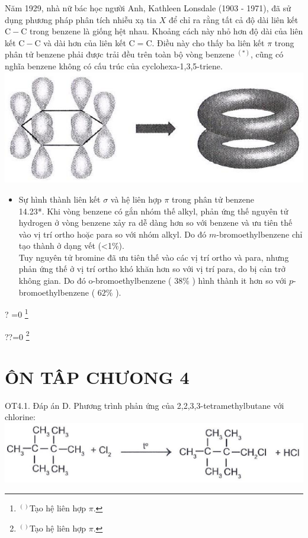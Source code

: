 \documentclass[10pt]{article}
\let\svthefootnote\thefootnote
\newcommand\blfootnotetext[1]{%
  \let\thefootnote\relax\footnote{#1}%
  \addtocounter{footnote}{-1}%
  \let\thefootnote\svthefootnote%
}
\let\svfootnotetext\footnotetext
\renewcommand\footnotetext[2][?]{%
  \if\relax#1\relax%
    \ifnum\value{footnote}=0\blfootnotetext{#2}\else\svfootnotetext{#2}\fi%
  \else%
    \if?#1\ifnum\value{footnote}=0\blfootnotetext{#2}\else\svfootnotetext{#2}\fi%
    \else\svfootnotetext[#1]{#2}\fi%
  \fi
}
\begin{document}
Năm 1929, nhà nữ bác học người Anh, Kathleen Lonsdale (1903 - 1971), đã sử dụng phương pháp phân tích nhiễu xạ tia $X$ để chỉ ra rằng tất cả độ dài liên kết $\mathrm{C}-\mathrm{C}$ trong benzene là giống hệt nhau. Khoảng cách này nhỏ hơn độ dài của liên kết $\mathrm{C}-\mathrm{C}$ và dài hơn của liên kết $\mathrm{C}=\mathrm{C}$. Điều này cho thấy ba liên kết $\pi$ trong phân tử benzene phải được trải đều trên toàn bộ vòng benzene ${ }^{(*)}$, cũng có nghĩa benzene không có cấu trúc của cyclohexa-1,3,5-triene.\\
\includegraphics[max width=\textwidth, center]{2025_10_23_adad5b98d65ac6665838g-28}

\begin{itemize}
  \item Sự hình thành liên kết $\sigma$ và hệ liên hợp $\pi$ trong phân tử benzene\\
14.23*. Khi vòng benzene có gắn nhóm thế alkyl, phản ứng thế nguyên tử hydrogen ở vòng benzene xảy ra dễ dàng hơn so với benzene và ưu tiên thế vào vị trí ortho hoặc para so với nhóm alkyl. Do đó $m$-bromoethylbenzene chỉ tạo thành ở dạng vết (<1\%).\\
Tuy nguyên tử bromine đã ưu tiên thế vào các vị trí ortho và para, nhưng phản ứng thế ở vị trí ortho khó khăn hơn so với vị trí para, do bị cản trở không gian. Do đó o-bromoethylbenzene ( $38 \%$ ) hình thành it hơn so với $p$-bromoethylbenzene ( $62 \%$ ).
\end{itemize}

\section*{ÔN TÂP CHƯONG 4}
OT4.1. Đáp án D. Phương trình phản ứng của 2,2,3,3-tetramethylbutane với chlorine:\\
\includegraphics[max width=\textwidth, center]{2025_10_23_adad5b98d65ac6665838g-28(1)}
\end{document}
